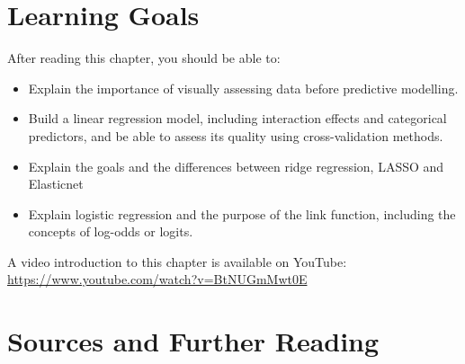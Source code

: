 %
%
\section*{Learning Goals}

After reading this chapter, you should be able to:
\begin{itemize}
   \item Explain the importance of visually assessing data before predictive modelling.
   \item Build a linear regression model, including interaction effects and categorical predictors, and be able to assess its quality using cross-validation methods.
   \item Explain the goals and the differences between ridge regression, LASSO and Elasticnet
   \item Explain logistic regression and the purpose of the link function, including the concepts of log-odds or logits.
\end{itemize}

\begin{advanced}
\begin{videobox}
A video introduction to this chapter is available on YouTube:\\

\url{https://www.youtube.com/watch?v=BtNUGmMwt0E}
\end{videobox}
\end{advanced}

\section*{Sources and Further Reading}

